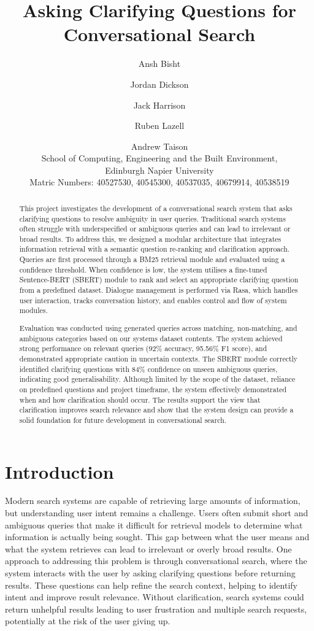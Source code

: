 \documentclass[11pt]{article}
\title{Asking Clarifying Questions for Conversational Search}
\author{
  Ansh Bisht \and
  Jordan Dickson \and
  Jack Harrison \and
  Ruben Lazell \and
  Andrew Taison  \\
  School of Computing, Engineering and the Built Environment, \\
  Edinburgh Napier University \\
  Matric Numbers: 40527530, 40545300, 40537035, 40679914, 40538519
}
\begin{document}
\maketitle
\begin{abstract}
  This project investigates the development of a conversational search system that asks clarifying questions to resolve ambiguity in user queries. Traditional search systems often struggle with underspecified or ambiguous queries and can lead to irrelevant or broad results. To address this, we designed a modular architecture that integrates information retrieval with a semantic question re-ranking and clarification approach. Queries are first processed through a BM25 retrieval module and evaluated using a confidence threshold. When confidence is low, the system utilises a fine-tuned Sentence-BERT (SBERT) module to rank and select an appropriate clarifying question from a predefined dataset. Dialogue management is performed via Rasa, which handles user interaction, tracks conversation history, and enables control and flow of system modules.
  
  Evaluation was conducted using generated queries across matching, non-matching, and ambiguous categories based on our systems dataset contents. The system achieved strong performance on relevant queries (92\% accuracy, 95.56\% F1 score), and demonstrated appropriate caution in uncertain contexts. The SBERT module correctly identified clarifying questions with 84\% confidence on unseen ambiguous queries, indicating good generalisability. Although limited by the scope of the dataset, reliance on predefined questions and project timeframe, the system effectively demonstrated when and how clarification should occur. The results support the view that clarification improves search relevance and show that the system design can provide a solid foundation for future development in conversational search.
\end{abstract}


\section{Introduction}
Modern search systems are capable of retrieving large amounts of information, but understanding user intent remains a challenge. Users often submit short and ambiguous queries that make it difficult for retrieval models to determine what information is actually being sought. This gap between what the user means and what the system retrieves can lead to irrelevant or overly broad results. One approach to addressing this problem is through conversational search, where the system interacts with the user by asking clarifying questions before returning results. These questions can help refine the search context, helping to identify intent and improve result relevance. Without clarification, search systems could return unhelpful results leading to user frustration and multiple search requests, potentially at the risk of the user giving up.
\end{document}
